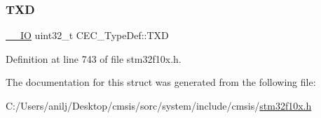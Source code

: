\subsubsection{\texorpdfstring{T\+XD}{TXD}}
{\footnotesize\ttfamily \hyperlink{core__sc300_8h_aec43007d9998a0a0e01faede4133d6be}{\+\_\+\+\_\+\+IO} uint32\+\_\+t C\+E\+C\+\_\+\+Type\+Def\+::\+T\+XD}



Definition at line 743 of file stm32f10x.\+h.



The documentation for this struct was generated from the following file\+:\begin{DoxyCompactItemize}
\item 
C\+:/\+Users/anilj/\+Desktop/cmsis/sorc/system/include/cmsis/\hyperlink{stm32f10x_8h}{stm32f10x.\+h}\end{DoxyCompactItemize}
